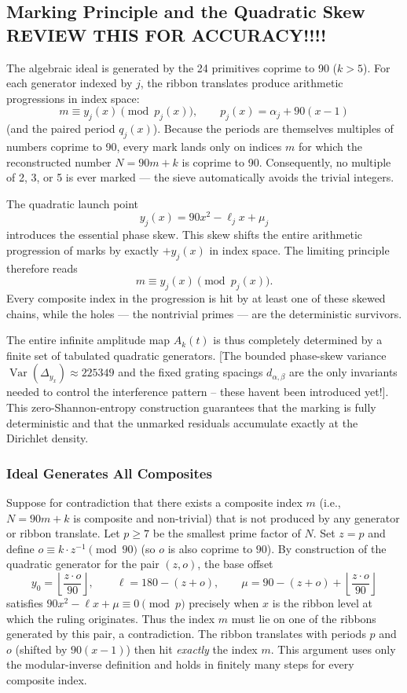 \documentclass[11pt,a4paper]{article}
\begin{document}
\subsection{Marking Principle and the Quadratic Skew REVIEW THIS FOR ACCURACY!!!!}

The algebraic ideal is generated by the 24 primitives coprime to 90 (\(k>5\)). For each generator indexed by \(j\), the ribbon translates produce arithmetic progressions in index space:
\[
m \equiv y_j(x) \pmod{p_j(x)}, \qquad p_j(x)=\alpha_j + 90(x-1)
\]
(and the paired period \(q_j(x)\)). Because the periods are themselves multiples of numbers coprime to 90, every mark lands only on indices \(m\) for which the reconstructed number \(N=90m+k\) is coprime to 90. Consequently, no multiple of 2, 3, or 5 is ever marked — the sieve automatically avoids the trivial integers.

The quadratic launch point
\[
y_j(x) = 90x^2 - \ell_j x + \mu_j
\]
introduces the essential phase skew. This skew shifts the entire arithmetic progression of marks by exactly \(+y_j(x)\) in index space. The limiting principle therefore reads
\[
m \equiv y_j(x) \pmod{p_j(x)}.
\]
Every composite index in the progression is hit by at least one of these skewed chains, while the holes — the nontrivial primes — are the deterministic survivors.

The entire infinite amplitude map \(A_k(t)\) is thus completely determined by a finite set of tabulated quadratic generators. [The bounded phase-skew variance \(\operatorname{Var}(\Delta_{y_x})\approx225349\) and the fixed grating spacings \(d_{\alpha,\beta}\) are the only invariants needed to control the interference pattern -- these havent been introduced yet!]. This zero-Shannon-entropy construction guarantees that the marking is fully deterministic and that the unmarked residuals accumulate exactly at the Dirichlet density.

\subsubsection{Ideal Generates All Composites}
Suppose for contradiction that there exists a composite index $m$ (i.e., $N=90m+k$ is composite and non-trivial) that is not produced by any generator or ribbon translate. Let $p\geq7$ be the smallest prime factor of $N$. Set $z=p$ and define $o\equiv k\cdot z^{-1}\pmod{90}$ (so $o$ is also coprime to $90$). By construction of the quadratic generator for the pair $(z,o)$, the base offset
\[
y_0=\left\lfloor\frac{z\cdot o}{90}\right\rfloor, \qquad \ell=180-(z+o), \qquad \mu=90-(z+o)+\left\lfloor\frac{z\cdot o}{90}\right\rfloor
\]
satisfies $90x^2-\ell x+\mu\equiv0\pmod{p}$ precisely when $x$ is the ribbon level at which the ruling originates. Thus the index $m$ must lie on one of the ribbons generated by this pair, a contradiction. The ribbon translates with periods $p$ and $o$ (shifted by $90(x-1)$) then hit \emph{exactly} the index $m$. This argument uses only the modular-inverse definition and holds in finitely many steps for every composite index. 
\end{document}
